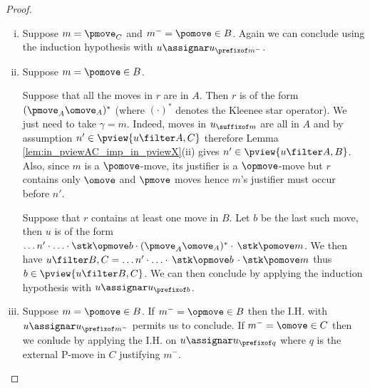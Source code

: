 \begin{proof}
\begin{enumerate}[i.]
\item Suppose $m = \pmove_C$ and $m^- = \pomove \in B$.
Again we can conclude using
the induction hypothesis with $u \assignar u_{\prefixof m^-}$.

\item Suppose $m = \pomove \in B$.

Suppose that all the moves in $r$ are in $A$.
Then $r$ is of the form $(\pmove_A \omove_A)^*$ (where $(\cdot)^*$ denotes the Kleenee star operator).
We just need to take $\gamma = m$.
Indeed, moves in $u_{\suffixof m}$ are all in $A$
and by assumption $n'\in\pview{u\filter A,C}$  therefore
Lemma \ref{lem:in_pviewAC_imp_in_pviewX}(ii) gives
$n'\in\pview{u\filter A,B}$.
Also, since $m$ is a $\pomove$-move,
its justifier is a $\opmove$-move but $r$ contains only $\omove$ and $\pmove$ moves hence $m$'s justifier must occur before $n'$.

Suppose that $r$ contains at least one move in $B$. Let $b$ be the last such move, then $u$ is of the form $\ldots n' \cdot \ldots \cdot \stk\opmove  b \cdot (\pmove_A \omove_A)^* \cdot\thinspace\stk\pomove m $. We then have
$u\filter B,C = \ldots n' \cdot \ldots \cdot
\thinspace\stk\opmove b \thinspace\cdot \stk\pomove m $ thus $b \in \pview{u\filter B,C}$. We can then conclude by applying the induction hypothesis with $u \assignar u_{\prefixof b}$.

\item Suppose $m = \pomove \in B$.
If $m^- = \opmove \in B$ then the I.H. with $u \assignar u_{\prefixof m^-}$ permits us to conclude.
If $m^- = \omove \in C$ then we conlude by applying  the I.H. on $u \assignar u_{\prefixof q}$ where $q$ is the external P-move in $C$ justifying
$m^-$.
\end{enumerate}
\end{proof}

